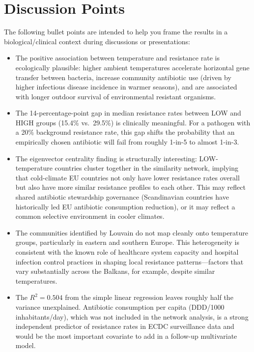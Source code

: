 \documentclass[12pt,a4paper]{article}
\begin{document}
\section{Discussion Points}

The following bullet points are intended to help you frame the results
in a biological/clinical context during discussions or presentations:

\begin{itemize}
  \item The positive association between temperature and resistance rate is
    ecologically plausible: higher ambient temperatures accelerate
    horizontal gene transfer between bacteria, increase community antibiotic
    use (driven by higher infectious disease incidence in warmer seasons),
    and are associated with longer outdoor survival of environmental
    resistant organisms.

  \item The 14-percentage-point gap in median resistance rates between
    LOW and HIGH groups (15.4\% vs.\ 29.5\%) is clinically meaningful.
    For a pathogen with a 20\% background resistance rate, this gap
    shifts the probability that an empirically chosen antibiotic will
    fail from roughly 1-in-5 to almost 1-in-3.

  \item The eigenvector centrality finding is structurally interesting:
    LOW-temperature countries cluster together in the similarity network,
    implying that cold-climate EU countries not only have lower resistance
    rates overall but also have more similar resistance profiles to each
    other.
    This may reflect shared antibiotic stewardship governance (Scandinavian
    countries have historically led EU antibiotic consumption reduction),
    or it may reflect a common selective environment in cooler climates.

  \item The communities identified by Louvain do not map cleanly onto
    temperature groups, particularly in eastern and southern Europe.
    This heterogeneity is consistent with the known role of healthcare
    system capacity and hospital infection control practices in shaping
    local resistance patterns---factors that vary substantially across
    the Balkans, for example, despite similar temperatures.

  \item The $R^2 = 0.504$ from the simple linear regression leaves
    roughly half the variance unexplained.
    Antibiotic consumption per capita (DDD/1000 inhabitants/day),
    which was not included in the network analysis, is a strong
    independent predictor of resistance rates in ECDC surveillance
    data and would be the most important covariate to add in a
    follow-up multivariate model.


\end{itemize}
\end{document}
